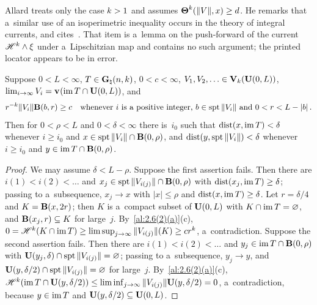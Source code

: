 \begin{remark}
    \label{rem:8.3}
    Allard treats only the case $k > 1$ and assumes $\boldsymbol{\Theta}^{k}(\|V\|,x) \ge d$. He
    remarks that a~similar use of an isoperimetric inequality occurs in the theory of integral
    currents, and cites~\cite[4.1.25]{Federer1969}. That item is a~lemma on the push-forward of
    the current $\mathscr{H}^{k} \wedge \xi$ under a~Lipschitzian map and contains no such argument;
    the printed locator appears to be in error.
\end{remark}

\begin{lemma}[new]
    \label{new:conv_plane}
    Suppose $0 < L < \infty$, $T \in \mathbf{G}_{\natural}(n,k)$, $0 < c < \infty$, $V_1, V_2, \ldots \in
    \mathbf{V}_{k}(\mathbf{U}(0,L))$, $\lim_{i \to \infty} V_i = \mathbf{v}_{}(\operatorname{im} T \cap \mathbf{U}(0,L))$, and
    \begin{displaymath}
        r^{-k} \|V_i\| \mathbf{B}(b,r) \ge c \quad \text{whenever $i$ is a positive integer, $b \in
        \operatorname{spt} \|V_i\|$ and $0 < r < L - |b|$} \,.
    \end{displaymath}
    Then for $0 < \rho < L$ and $0 < \delta < \infty$ there is~$i_0$ such that $\operatorname{dist}(x, \operatorname{im} T) <
    \delta$ whenever $i \ge i_0$ and $x \in \operatorname{spt} \|V_i\| \cap \mathbf{B}(0,\rho)$, and $\operatorname{dist}(y, \operatorname{spt}
    \|V_i\|) < \delta$ whenever $i \ge i_0$ and $y \in \operatorname{im} T \cap \mathbf{B}(0,\rho)$.
\end{lemma}

\begin{proof}
    We may assume $\delta < L - \rho$. Suppose the first assertion fails. Then there are $i(1) < i(2)
    < \ldots$ and $x_j \in \operatorname{spt} \|V_{i(j)}\| \cap \mathbf{B}(0,\rho)$ with $\operatorname{dist}(x_j, \operatorname{im} T) \ge
    \delta$; passing to a~subsequence, $x_j \to x$ with $|x| \le \rho$ and $\operatorname{dist}(x, \operatorname{im} T) \ge
    \delta$. Let $r = \delta / 4$ and $K = \mathbf{B}(x,2r)$; then $K$ is a~compact subset of
    $\mathbf{U}(0,L)$ with $K \cap \operatorname{im} T = \varnothing$, and $\mathbf{B}(x_j,r) \subseteq K$ for
    large~$j$. By~\ref{al:2.6(2)(a)}(c), $0 = \mathscr{H}^{k}(K \cap \operatorname{im} T) \ge \limsup_{j \to \infty}
    \|V_{i(j)}\|(K) \ge c r^{k}$, a~contradiction. Suppose the second assertion fails. Then there
    are $i(1) < i(2) < \ldots$ and $y_j \in \operatorname{im} T \cap \mathbf{B}(0,\rho)$ with $\mathbf{U}(y_j,\delta)
    \cap \operatorname{spt} \|V_{i(j)}\| = \varnothing$; passing to a~subsequence, $y_j \to y$, and
    $\mathbf{U}(y,\delta/2) \cap \operatorname{spt} \|V_{i(j)}\| = \varnothing$ for large~$j$. By~\ref{al:2.6(2)(a)}(c),
    $\mathscr{H}^{k}(\operatorname{im} T \cap \mathbf{U}(y,\delta/2)) \le \liminf_{j \to \infty} \|V_{i(j)}\|
    \mathbf{U}(y,\delta/2) = 0$, a~contradiction, because $y \in \operatorname{im} T$ and $\mathbf{U}(y,\delta/2)
    \subseteq \mathbf{U}(0,L)$.
\end{proof}

